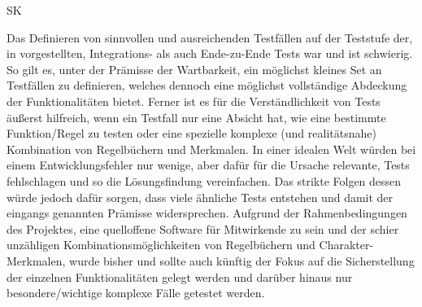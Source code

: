 \begin{enumerateWithCode}{SK}
    \item Das Definieren von sinnvollen und ausreichenden Testfällen auf der Teststufe der, in  vorgestellten, Integrations- als auch Ende-zu-Ende Tests war und ist schwierig.
    So gilt es, unter der Prämisse der Wartbarkeit, ein möglichst kleines Set an Testfällen zu definieren, welches dennoch eine möglichst vollständige Abdeckung der Funktionalitäten bietet.
    Ferner ist es für die Verständlichkeit von Tests äußerst hilfreich, wenn ein Testfall nur eine Absicht hat, wie \zB eine bestimmte Funktion/Regel zu testen oder eine spezielle komplexe (und realitätsnahe) Kombination von Regelbüchern und Merkmalen.
    In einer idealen Welt würden \zB bei einem Entwicklungsfehler nur wenige, aber dafür für die Ursache relevante, Tests fehlschlagen und so die Lösungsfindung vereinfachen.
    Das strikte Folgen dessen würde jedoch dafür sorgen, dass viele ähnliche Tests entstehen und damit der eingangs genannten Prämisse widersprechen.
    Aufgrund der Rahmenbedingungen des Projektes, eine  quelloffene Software für Mitwirkende zu sein und der schier unzähligen Kombinationsmöglichkeiten von Regelbüchern und Charakter-Merkmalen, wurde bisher und sollte auch künftig der Fokus auf die Sicherstellung der einzelnen Funktionalitäten gelegt werden und darüber hinaus nur besondere/wichtige komplexe Fälle getestet werden.

\end{enumerateWithCode}
